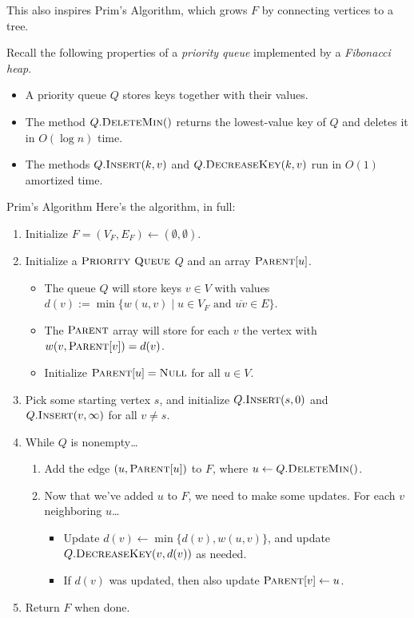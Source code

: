 This also inspires Prim's Algorithm, which grows $F$ by connecting vertices to a tree.

\begin{remark}
    Recall the following properties of a \emph{priority queue} implemented by a \emph{Fibonacci heap}.
    \begin{itemize}
        \item A priority queue $Q$ stores keys together with their values.
        \item The method $Q.\textsc{DeleteMin}()$ returns the lowest-value key of $Q$ and deletes it in $O(\log n)$ time.
        \item The methods $Q.\textsc{Insert}(k, v)$ and $Q.\textsc{DecreaseKey}(k, v)$ run in $O(1)$ amortized time.
    \end{itemize}
\end{remark}

\begin{solution}{Prim's Algorithm}
    Here's the algorithm, in full:
    \begin{enumerate}
        \item Initialize $F = (V_F, E_F) \leftarrow (\emptyset, \emptyset)$.
        \item Initialize a $\textsc{Priority Queue}$ $Q$ and an array $\textsc{Parent}[u]$.
        \begin{itemize}
            \item The queue $Q$ will store keys $v \in V$ with values $d(v) := \min \{ w(u, v) \mid u \in V_F \text{ and } \overline{uv} \in E\}$.
            \item The $\textsc{Parent}$ array will store for each $v$ the vertex with $w(v, \textsc{Parent}[v]) = d(v)$.
            \item Initialize $\textsc{Parent}[u] = \textsc{Null}$ for all $u \in V$.
        \end{itemize}
        \item Pick some starting vertex $s$, and initialize $Q.\textsc{Insert}(s, 0)$ and $Q.\textsc{Insert}(v, \infty)$ for all $v \neq s$.
        \item While $Q$ is nonempty\dots
        \begin{enumerate}
            \item Add the edge $(u, \textsc{Parent}[u])$ to $F$, where $u \leftarrow Q.\textsc{DeleteMin}()$.
            \item Now that we've added $u$ to $F$, we need to make some updates.  For each $v$ neighboring $u$\dots
            \begin{itemize}
                \item Update $d(v) \leftarrow  \min\{d(v), w(u, v)\}$, and update $Q.\textsc{DecreaseKey}(v, d(v))$ as needed.
                \item If $d(v)$ was updated, then also update $\textsc{Parent}[v] \leftarrow u$.
            \end{itemize}
        \end{enumerate}
        \item Return $F$ when done.
    \end{enumerate}
\end{solution}

